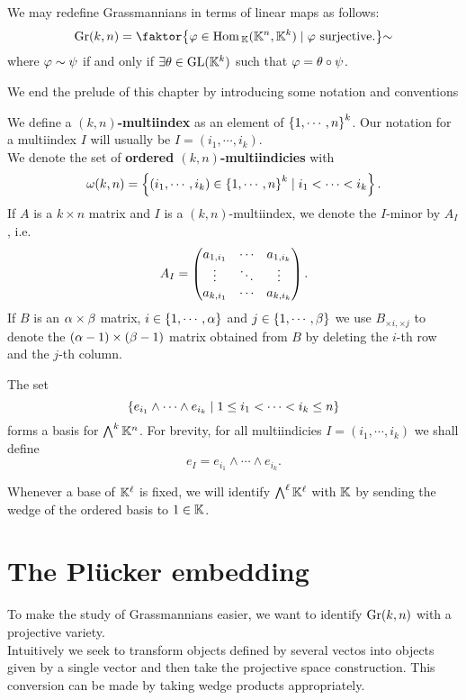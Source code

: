 \begin{corollary}\label{LinearQuotientDefinition}
We may redefine Grassmannians in terms of linear maps as follows:
\[\Gr(k,n)=\quot{\cpa{\vp\in \Hom_\K(\K^n,\K^k)\mid \vp\ \text{surjective.}}}\sim\]
where $\varphi\sim \psi$ if and only if $\exists \theta\in \mathrm{GL}(\mathbb{K}^k)$ such that $\varphi=\theta\circ \psi$.
\end{corollary}

\noindent We end the prelude of this chapter by introducing some notation and conventions
\begin{definition}[Multiindicies]
We define a \textbf{$(k,n)$-multiindex} as an element of $\left\{{1,\cdots, n}\right\}^k$. Our notation for a multiindex $I$ will usually be $I=(i_1,\cdots, i_k)$.\\
We denote the set of \textbf{ordered $(k,n)$-multiindicies} with
\[\omega(k,n)=\left\{{(i_1,\cdots, i_k)\in \left\{{1,\cdots, n}\right\}^k\mid i_1<\cdots<i_k}\right\}.\]
If $A$ is a $k\times n$ matrix and $I$ is a $(k,n)$-multiindex, we denote the $I$-minor by $A_I$, i.e.
\[A_I=\begin{pmatrix}a_{1,i_1} &\cdots &a_{1,i_{k}}\\\vdots &\ddots &\vdots\\a_{k,i_1}&\cdots&a_{k,i_k}\end{pmatrix}.\]
If $B$ is an $\alpha\times \beta$ matrix, $i\in\left\{{1,\cdots, \alpha}\right\}$ and $j\in \left\{{1,\cdots, \beta}\right\}$ we use $B_{\times i,\times j}$ to denote the $(\alpha-1)\times (\beta-1)$ matrix obtained from $B$ by deleting the $i$-th row and the $j$-th column.
\end{definition}

\begin{remark}
The set
\[\left\{{e_{i_1}\wedge\cdots\wedge e_{i_k}\mid 1\leq i_1<\cdots<i_k\leq n}\right\}\]
forms a basis for $\bigwedge^k\mathbb{K}^n$. For brevity, for all multiindicies $I=(i_1,\cdots, i_k)$ we shall define
\[e_I=e_{i_1}\wedge\cdots\wedge e_{i_k}.\]
\end{remark}

\begin{notation}
Whenever a base of $\mathbb{K}^\ell$ is fixed, we will identify $\bigwedge^\ell\mathbb{K}^\ell$ with $\mathbb{K}$ by sending the wedge of the ordered basis to $1\in\mathbb{K}$.
\end{notation}

\section{The Pl\"ucker embedding}
To make the study of Grassmannians easier, we want to identify $\mathrm{Gr}(k,n)$ with a projective variety.\\
Intuitively we seek to transform objects defined by several vectos into objects given by a single vector and then take the projective space construction. This conversion can be made by taking wedge products appropriately.

